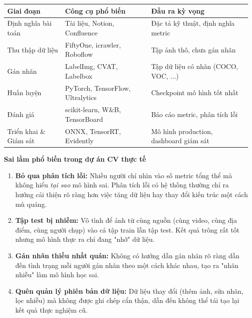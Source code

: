 \begin{center}
\begin{tabular}{|p{3.2cm}|p{4.5cm}|p{5.5cm}|}
\hline
\textbf{Giai đoạn} & \textbf{Công cụ phổ biến} & \textbf{Đầu ra kỳ vọng} \\
\hline
Định nghĩa bài toán & Tài liệu, Notion, Confluence & Đặc tả kỹ thuật, định nghĩa metric \\
\hline
Thu thập dữ liệu & FiftyOne, icrawler, Roboflow & Tập ảnh thô, chưa gán nhãn \\
\hline
Gán nhãn & LabelImg, CVAT, Labelbox & Tập dữ liệu có nhãn (COCO, VOC, ...) \\
\hline
Huấn luyện & PyTorch, TensorFlow, Ultralytics & Checkpoint mô hình tốt nhất \\
\hline
Đánh giá & scikit-learn, W\&B, TensorBoard & Báo cáo metric, phân tích lỗi \\
\hline
Triển khai \& Giám sát & ONNX, TensorRT, Evidently & Mô hình production, dashboard giám sát \\
\hline
\end{tabular}
\end{center}

\begin{mdframed}[style=infobox]
    \textbf{Sai lầm phổ biến trong dự án CV thực tế}

    \begin{enumerate}
        \item \textbf{Bỏ qua phân tích lỗi:} Nhiều người chỉ nhìn vào số metric tổng thể mà không hiểu \textit{tại sao} mô hình sai. Phân tích lỗi có hệ thống thường chỉ ra hướng cải thiện rõ ràng hơn việc tăng dữ liệu hay thay đổi kiến trúc một cách mù quáng.

        \item \textbf{Tập test bị nhiễm:} Vô tình để ảnh từ cùng nguồn (cùng video, cùng địa điểm, cùng người chụp) vào cả tập train lẫn tập test. Kết quả trông rất tốt nhưng mô hình thực ra chỉ đang "nhớ" dữ liệu.

        \item \textbf{Gán nhãn thiếu nhất quán:} Không có hướng dẫn gán nhãn rõ ràng dẫn đến tình trạng mỗi người gán nhãn theo một cách khác nhau, tạo ra "nhãn nhiễu" làm mô hình học sai.

        \item \textbf{Quên quản lý phiên bản dữ liệu:} Dữ liệu thay đổi (thêm ảnh, sửa nhãn, lọc nhiễu) mà không được ghi chép cẩn thận, dẫn đến không thể tái tạo lại kết quả thực nghiệm cũ.
    \end{enumerate}
\end{mdframed}

